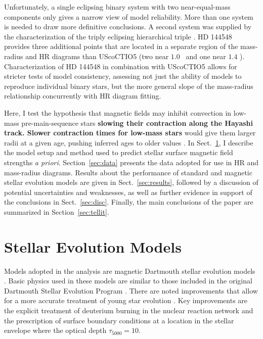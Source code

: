 \documentclass{aa}
\begin{document}
Unfortunately, a single eclipsing binary system with two near-equal-mass components only gives a narrow view of model reliability. More than one system is needed to draw more definitive conclusions. A second system was supplied by the characterization of the triply eclipsing hierarchical triple  \citep{Alonso2015}. HD 144548 provides three additional points that are located in a separate region of the mass-radius and HR diagrams than UScoCTIO5 (two near $1.0$ \msun\ and one near $1.4$ \msun). Characterization of HD 144548 in combination with UScoCTIO5 allows for stricter tests of model consistency, assessing not just the ability of models to reproduce individual binary stars, but the more general slope of the mass-radius relationship concurrently with HR diagram fitting.

Here, I test the hypothesis that magnetic fields may inhibit convection in low-mass pre-main-sequence stars {\bf slowing their contraction along the Hayashi track. Slower contraction times for low-mass stars} would give them larger radii at a given age, pushing inferred ages to older values \citep[e.g.,][]{MM10, Malo2014}.  
In Sect.~\ref{sec:models}, I describe the model setup and method used to predict stellar surface magnetic field strengths \emph{a priori}. Section~\ref{sec:data} presents the data adopted for use in HR and mass-radius diagrams. Results about the performance of standard and magnetic stellar evolution models are given in Sect.~\ref{sec:results}, followed by  a discussion of potential uncertainties and weaknesses, as well as further evidence in support of the conclusions in Sect.~\ref{sec:disc}. Finally, the main conclusions of the paper are summarized in Section~\ref{sec:tellit}.


\section{Stellar Evolution Models}
\label{sec:models}
Models adopted in the analysis are magnetic Dartmouth stellar evolution models \citep{FC12b}. Basic physics used in these models are similar to those included in the original Dartmouth Stellar Evolution Program \citep[DSEP;][]{Dotter2008}. There are noted improvements that allow for a more accurate treatment of young star evolution \citep[see, e.g.,][]{Malo2014}. Key improvements are the explicit treatment of deuterium burning in the nuclear reaction network and the prescription of surface boundary conditions at a location in the stellar envelope where the optical depth $\tau_{5000} = 10$. 
\end{document}
